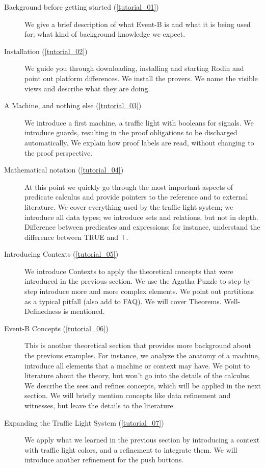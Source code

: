 \begin{description}
	\item[Background before getting started (\ref{tutorial_01})] We give a brief description of what Event-B is and what it is being used for; what kind of background knowledge we expect.
	\item[Installation (\ref{tutorial_02})] We guide you through downloading, installing and starting Rodin and point out platform differences.  We install the provers.  We name the visible views and describe what they are doing.
	\item[A Machine, and nothing else (\ref{tutorial_03})] We introduce a first machine, a traffic light with booleans for signals.  We introduce guards, resulting in the proof obligations to be discharged automatically.  We explain how proof labels are read, without changing to the proof perspective.
	\item[Mathematical notation (\ref{tutorial_04})] At this point we quickly go through the most important aspects of predicate calculus and provide pointers to the reference and to external literature.  We cover everything used by the traffic light system; we introduce all data types; we introduce sets and relations, but not in depth.  Difference between predicates and expressions; for instance, understand the difference between TRUE and $\top$.  
	\item[Introducing Contexts (\ref{tutorial_05})] We introduce Contexts to apply the theoretical concepts that were introduced in the previous section.  We use the Agatha-Puzzle to step by step introduce more and more complex elements.  We point out partitions as a typical pitfall (also add to FAQ).  We will cover Theorems. Well-Definedness is mentioned.
	\item[Event-B Concepts (\ref{tutorial_06})] This is another theoretical section that provides more background about the previous examples.  For instance, we analyze the anatomy of a machine, introduce all elements that a machine or context may have. We point to literature about the theory, but won't go into the details of the  calculus.  We describe the sees and refines concepts, which will be applied in the next section.  We will briefly mention concepts like data refinement and witnesses, but leave the details to the literature.
	\item[Expanding the Traffic Light System (\ref{tutorial_07})]  We apply what we learned in the previous section by introducing a context with traffic light colors, and a refinement to integrate them.  We will introduce another refinement for the push buttons.


\end{description}

